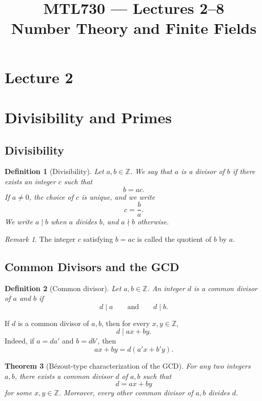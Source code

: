 \documentclass[11pt]{article}
\title{\textbf{MTL730 --- Lectures 2--8}\\[2mm]
\large Number Theory and Finite Fields}
\author{}
\date{}
\newtheorem{theorem}{Theorem}[section]
\newtheorem{definition}[theorem]{Definition}
\theoremstyle{remark}
\newtheorem*{remark}{Remark}
\newcommand{\Z}{\mathbb Z}
\begin{document}
\maketitle
\tableofcontents
\newpage
\section*{Lecture 2}

\section{Divisibility and Primes}

\subsection{Divisibility}

\begin{definition}[Divisibility]
Let $a,b\in\Z$. We say that $a$ is a \emph{divisor} of $b$ if there exists
an integer $c$ such that
\[
    b=ac.
\]
If $a\neq 0$, the choice of $c$ is unique, and we write
\[
    c=\frac{b}{a}.
\]
We write $a\mid b$ when $a$ divides $b$, and $a\nmid b$ otherwise.
\end{definition}

\begin{remark}
The integer $c$ satisfying $b=ac$ is called the quotient of $b$ by $a$.
\end{remark}

\subsection{Common Divisors and the GCD}

\begin{definition}[Common divisor]
Let $a,b\in\Z$. An integer $d$ is a \emph{common divisor} of $a$ and $b$
if
\[
    d\mid a
    \qquad\text{and}\qquad
    d\mid b.
\]
\end{definition}

If $d$ is a common divisor of $a,b$, then for every $x,y\in\Z$,
\[
    d\mid ax+by.
\]
Indeed, if $a=da'$ and $b=db'$, then
\[
    ax+by=d(a'x+b'y).
\]

\begin{theorem}[B\'ezout-type characterization of the GCD]
For any two integers $a,b$, there exists a common divisor $d$ of $a,b$
such that
\[
    d=ax+by
\]
for some $x,y\in\Z$.
Moreover, every other common divisor of $a,b$ divides $d$.
\end{theorem}
\end{document}
